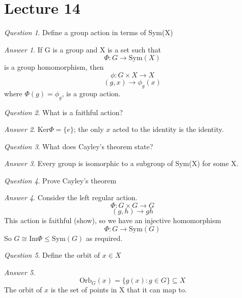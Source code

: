 \documentclass[]{article}
\theoremstyle{remark}
\theoremstyle{qnstyle}
\newtheorem{question}{Question}
\theoremstyle{answerstyle}
\newtheorem*{answer}{Answer}
\begin{document}
\section*{Lecture 14}
{
    \begin{question}
        Define a group action in terms of Sym(X)
    \end{question}
    \begin{answer}
        If G is a group and X is a set such that $$\Phi: G \to \text{Sym}(X)$$ 
        is a group homomorphism, then
        $$\phi: G \times X \to X$$
        $$(g, x) \to \phi_g(x)$$
        where $\Phi(g) = \phi_g$, is a group action.
    \end{answer}
}
{
    \begin{question}
        What is a faithful action?
    \end{question}
    \begin{answer}
        $\text{Ker}\Phi = \{e\}$; the only $x$ acted to the identity is the identity.
    \end{answer}
}
{
    \begin{question}
        What does Cayley's theorem state?
    \end{question}
    \begin{answer}
        Every group is isomorphic to a subgroup of Sym(X) for some X.
    \end{answer}

    \begin{question}
        Prove Cayley's theorem
    \end{question}
    \begin{answer}
        Consider the left regular action.
        $$\Phi: G \times G \to G$$
        $$(g,h) \to gh$$
        This action is faithful (show), so we have an injective homomorphism
        $$\Phi: G \to \text{Sym}(G)$$
        So $G \cong \text{Im}\Phi \leq \text{Sym}(G)$ as required.
    \end{answer}

    \begin{question}
        Define the orbit of $x \in X$
    \end{question}
    \begin{answer}
        $$\text{Orb}_G(x) = \{g(x): g \in G \} \subseteq X$$
        The orbit of $x$ is the set of points in X that it can map to.
    \end{answer}
}
\end{document}
